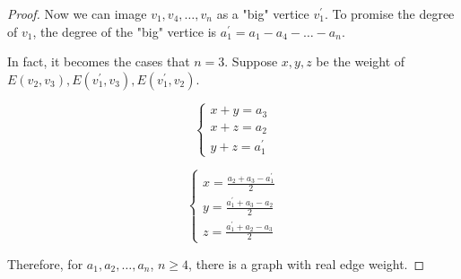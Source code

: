 \begin{exercise}
\begin{proof}
        Now we can image $v_1, v_4, \dots, v_n$ as a "big" vertice $v_1^\prime$. To promise the degree of $v_1$, the degree of the "big" vertice is $a_1^\prime = a_1 - a_4 - \dots - a_n$.

        In fact, it becomes the cases that $n=3$.
        Suppose $x, y, z$ be the weight of $E(v_2, v_3), E(v_1^\prime, v_3), E(v_1^\prime, v_2)$.

        $$
        \begin{cases}
            x + y = a_3 \\
            x + z = a_2 \\
            y + z = a_1^\prime
        \end{cases}
        $$

        $$
        \begin{cases}
            x = \frac{a_2 + a_3 - a_1^\prime}{2} \\
            y = \frac{a_1^\prime + a_3 - a_2}{2} \\
            z = \frac{a_1^\prime + a_2 - a_3}{2}
        \end{cases}
        $$

    Therefore, for $a_1, a_2, \dots, a_n$, $n \geq 4$, there is a graph with real edge weight.

    \end{proof}
\end{exercise}

